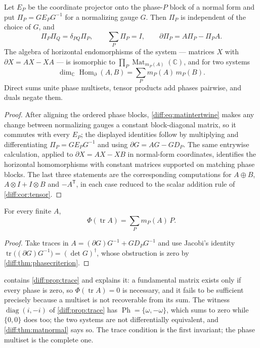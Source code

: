 \documentclass[11pt,letterpaper]{article}
\numberwithin{equation}{section}
\theoremstyle{definition}
\theoremstyle{remark}
\newcommand{\C}{\mathbb C}
\newcommand{\der}{\partial}
\newcommand{\Mat}{\operatorname{Mat}}
\newcommand{\tr}{\operatorname{tr}}
\newcommand{\Homd}{\operatorname{Hom}_{\der}}
\newcommand{\Ph}{\operatorname{Ph}}
\begin{document}
\begin{proposition}
\label{diff:prop:matprojectors}
Let $E_{P}$ be the coordinate projector onto the phase-$P$ block of a normal
form and put $\Pi_{P}=GE_{P}G^{-1}$ for a normalizing gauge $G$. Then
$\Pi_{P}$ is independent of the choice of $G$, and
\[
 \Pi_{P}\Pi_{Q}=\delta_{PQ}\Pi_{P},
 \qquad \sum_{P}\Pi_{P}=I,
 \qquad \der\Pi_{P}=A\Pi_{P}-\Pi_{P}A .
\]
The algebra of horizontal endomorphisms of the system --- matrices $X$ with
$\der X=AX-XA$ --- is isomorphic to $\prod_{P}\Mat_{m_{P}(A)}(\C)$, and for
two systems
\[
 \dim_{\C}\Homd(A,B)=\sum_{P}m_{P}(A)\,m_{P}(B).
\]
Direct sums unite phase multisets, tensor products add phases pairwise, and
duals negate them.
\end{proposition}
\begin{proof}
After aligning the ordered phase blocks, \cref{diff:eq:matintertwine} makes
any change between normalizing gauges a constant block-diagonal matrix, so it commutes with every $E_{P}$; the
displayed identities follow by multiplying and differentiating
$\Pi_{P}=GE_{P}G^{-1}$ and using $\der G=AG-GD_{P}$. The same entrywise
calculation, applied to $\der X=AX-XB$ in normal-form coordinates, identifies
the horizontal homomorphisms with constant matrices supported on matching
phase blocks. The last three statements are the corresponding computations for
$A\oplus B$, $A\otimes I+I\otimes B$ and $-A^{\mathsf T}$, in each case reduced
to the scalar addition rule of \cref{diff:cor:tensor}.
\end{proof}

\begin{corollary}
\label{diff:cor:mattrace}
For every finite $A$,
\begin{equation}\label{diff:eq:mattrace}
 \Phi(\tr A)=\sum_{P}m_{P}(A)\,P .
\end{equation}
\end{corollary}
\begin{proof}
Take traces in $A=(\der G)G^{-1}+GD_{P}G^{-1}$ and use Jacobi's identity
$\tr\bigl((\der G)G^{-1}\bigr)=(\det G)^{\dagger}$, whose obstruction is zero
by \cref{diff:thm:phasecriterion}.
\end{proof}

 contains \cref{diff:prop:trace} and explains it: a
fundamental matrix exists only if every phase is zero, so
$\Phi(\tr A)=0$ is necessary, and it fails to be sufficient precisely because
a multiset is not recoverable from its sum. The witness
$\operatorname{diag}(i,-i)$ of \cref{diff:prop:trace} has
$\Ph=\{\omega,-\omega\}$, which sums to zero while
$\{0,0\}$ does too; the two systems are not differentially equivalent, and
\cref{diff:thm:matnormal} says so. The trace condition is the first invariant;
the phase multiset is the complete one.
\end{document}
